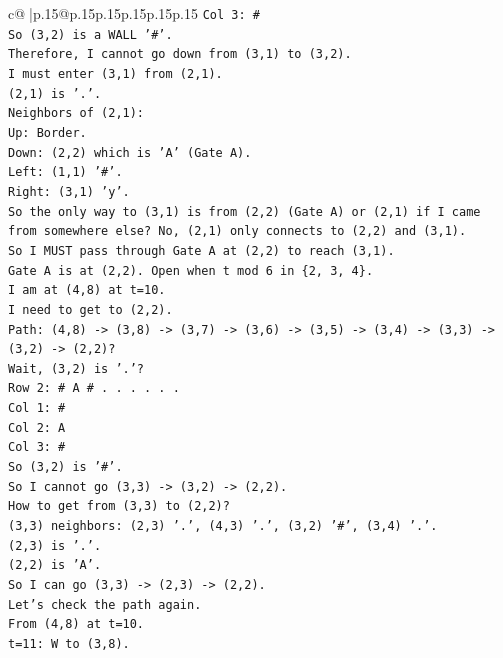 \documentclass{article}
\begin{document}
{\begin{supertabular}{c@{$\;$}|p{.15\linewidth}@{}p{.15\linewidth}p{.15\linewidth}p{.15\linewidth}p{.15\linewidth}p{.15\linewidth}}
{{{\texttt{Col 3: \#} \\
\texttt{So (3,2) is a WALL '\#'.} \\
\texttt{Therefore, I cannot go down from (3,1) to (3,2).} \\
\texttt{I must enter (3,1) from (2,1).} \\
\texttt{(2,1) is '.'.} \\
\texttt{Neighbors of (2,1):} \\
\texttt{Up: Border.} \\
\texttt{Down: (2,2) which is 'A' (Gate A).} \\
\texttt{Left: (1,1) '\#'.} \\
\texttt{Right: (3,1) 'y'.} \\
\texttt{So the only way to (3,1) is from (2,2) (Gate A) or (2,1) if I came from somewhere else? No, (2,1) only connects to (2,2) and (3,1).} \\
\texttt{So I MUST pass through Gate A at (2,2) to reach (3,1).} \\
\texttt{Gate A is at (2,2). Open when t mod 6 in \{2, 3, 4\}.} \\
\texttt{I am at (4,8) at t=10.} \\
\texttt{I need to get to (2,2).} \\
\texttt{Path: (4,8) {-}> (3,8) {-}> (3,7) {-}> (3,6) {-}> (3,5) {-}> (3,4) {-}> (3,3) {-}> (3,2) {-}> (2,2)?} \\
\texttt{Wait, (3,2) is '.'?} \\
\texttt{Row 2: \# A \# . . . . . .} \\
\texttt{Col 1: \#} \\
\texttt{Col 2: A} \\
\texttt{Col 3: \#} \\
\texttt{So (3,2) is '\#'.} \\
\texttt{So I cannot go (3,3) {-}> (3,2) {-}> (2,2).} \\
\texttt{How to get from (3,3) to (2,2)?} \\
\texttt{(3,3) neighbors: (2,3) '.', (4,3) '.', (3,2) '\#', (3,4) '.'.} \\
\texttt{(2,3) is '.'.} \\
\texttt{(2,2) is 'A'.} \\
\texttt{So I can go (3,3) {-}> (2,3) {-}> (2,2).} \\
\texttt{Let's check the path again.} \\
\texttt{From (4,8) at t=10.} \\
\texttt{t=11: W to (3,8).} \\
}}}
\end{supertabular}}
\end{document}
